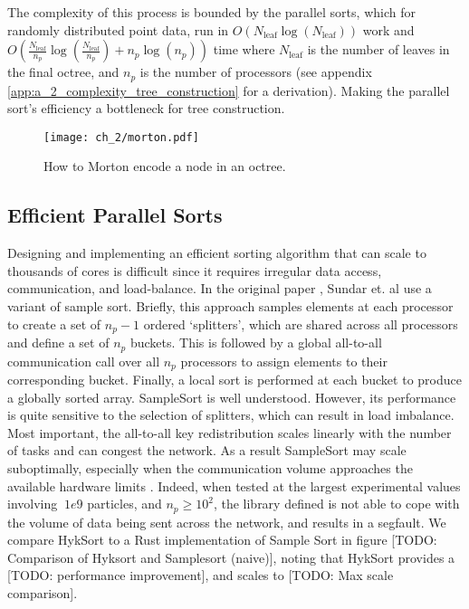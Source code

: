 The complexity of this process is bounded by the parallel sorts, which for randomly distributed point data, run in $O(N_{\text{leaf}} \log (N_{\text{leaf}}))$ work and $O(\frac{N_{\text{leaf}}}{n_p} \log(\frac{N_{\text{leaf}}}{n_p}) + n_p \log (n_p))$ time where $N_{\text{leaf}}$ is the number of leaves in the final octree, and $n_p$ is the number of processors (see appendix \ref{app:a_2_complexity_tree_construction} for a derivation). Making the parallel sort's efficiency a bottleneck for tree construction.

\begin{figure}
    \centerline{\texttt{[image: ch\_2/morton.pdf]}}
    \caption{How to Morton encode a node in an octree.}
    \label{fig:sec_2_4:morton}
\end{figure}

\subsection*{Efficient Parallel Sorts}

Designing and implementing an efficient sorting algorithm that can scale to thousands of cores is difficult since it requires irregular data access, communication, and load-balance. In the original paper \cite{sundar2008bottom}, Sundar et. al use a variant of sample sort. Briefly, this approach samples elements at each processor to create a set of $n_p - 1 $ ordered `splitters', which are shared across all processors and define a set of $n_p$ buckets. This is followed by a global all-to-all communication call over all $n_p$ processors to assign elements to their corresponding bucket. Finally, a local sort is performed at each bucket to produce a globally sorted array. SampleSort is well understood. However, its performance is quite sensitive to the selection of splitters, which can result in load imbalance. Most important, the all-to-all key redistribution scales linearly with the number of tasks and can congest the network. As a result SampleSort may scale suboptimally, especially when the communication volume approaches the available hardware limits \cite{sundar2013hyksort}. Indeed, when tested at the largest experimental values involving $~1e9$ particles, and $n_p \geq 10^2$, the library defined  is not able to cope with the volume of data being sent across the network, and results in a segfault. We compare HykSort to a Rust implementation of Sample Sort in figure [TODO: Comparison of Hyksort and Samplesort (naive)], noting that HykSort provides a [TODO: performance improvement], and scales to [TODO: Max scale comparison].

